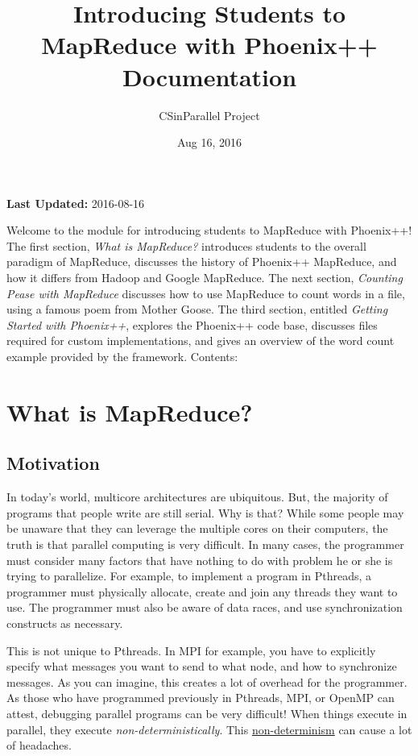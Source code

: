 \documentclass[letterpaper,10pt,openany,oneside]{sphinxmanual}
\title{Introducing Students to MapReduce with Phoenix++ Documentation}
\date{Aug 16, 2016}
\author{CSinParallel Project}
\begin{document}
\maketitle
\tableofcontents
{}\label{index::doc}


\textbf{Last Updated:} 2016-08-16

Welcome to the module for introducing students to MapReduce with Phoenix++!
The first section, \emph{What is MapReduce?} introduces students to the overall
paradigm of MapReduce, discusses the history of Phoenix++ MapReduce, and how it
differs from Hadoop and Google MapReduce. The next section, \emph{Counting Pease
with MapReduce} discusses how to use MapReduce to count words in a file, using
a famous poem from Mother Goose. The third section, entitled \emph{Getting Started
with Phoenix++}, explores the Phoenix++ code base, discusses files required for
custom implementations, and gives an overview of the word count example provided
by the framework.
Contents:


\chapter{What is MapReduce?}
\label{MRIntro/MRIntro:introducing-students-to-mapreduce-with-phoenix}\label{MRIntro/MRIntro:what-is-mapreduce}\label{MRIntro/MRIntro::doc}

\section{Motivation}
\label{MRIntro/MRIntro:motivation}
In today's world, multicore architectures are ubiquitous. But, the majority of
programs that people write are still serial. Why is that? While some people may
be unaware that they can leverage the multiple cores on their computers, the
truth is that parallel computing is very difficult. In many cases, the
programmer must consider many factors that have nothing to do with problem he
or she is trying to parallelize. For example, to implement a program in Pthreads,
a programmer must physically allocate, create and join any threads they want to
use. The programmer must also be aware of data races, and use synchronization
constructs as necessary.

This is not unique to Pthreads. In MPI for example, you have to explicitly
specify what messages you want to send to what node, and how to synchronize
messages. As you can imagine, this creates a lot of overhead for the
programmer. As those who have programmed previously in Pthreads, MPI, or OpenMP
can attest, debugging parallel programs can be very difficult! When things
execute in parallel, they execute \emph{non-deterministically}. This \href{https://en.wikipedia.org/wiki/Unbounded\_nondeterminism}{non-determinism}
can cause a lot of headaches.
\end{document}
